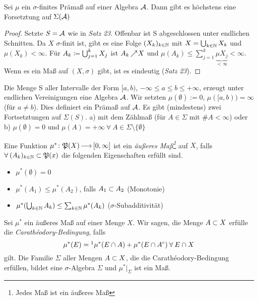 \documentclass[skript.tex]{subfiles}
\begin{document}
	\begin{cor}
		Sei $\mu$ ein $\sigma$-finites Prämaß auf einer Algebra $\mathcal{A}$. Dann gibt es höchstens eine Forsetztung auf $\Sigma(\mathcal{A})$
	\end{cor}
	\begin{proof}
		Setzte $S=\mathcal{A}$ wie in \textit{Satz 23}. Offenbar ist S abgeschlossen unter endlichen Schnitten. Da $X$ $\sigma$-finit ist, gibt es eine Folge $(X_k)_{k\in\mathbb{N}}$ mit $X=\bigcup_{k\in\mathbb{N}}X_k$ und $\mu(X_k)<\infty$. Für $A_k\coloneqq\bigcup_{j=1}^{k}X_j$ ist $A_k \kern -1pt \nearrow \kern -2pt X$ und $\mu(A_k) \leq \sum_{j=1}^{k}\underbrace{\mu{X_j}}_{<\infty}<\infty$. Wenn es ein Maß auf $(X,\sigma)$ gibt, ist es eindeutig (\textit{Satz 23}).
	\end{proof}

	\begin{bsp}
		Die Menge S aller Intervalle der Form $[a,b)$, $-\infty\leq a \leq b \leq +\infty$, erzeugt unter endlichen Vereinigungen eine Algebra $\mathcal{A}$. Wir setzten $\mu(\emptyset):=0$, $\mu([a,b))=\infty$ (für $a\neq b$). Dies definiert ein Prämaß auf $\mathcal{A}$. Es gibt (mindestens) zwei Fortsetztungen auf $\Sigma(S)$. a) mit dem Zählmaß (für $A\in\Sigma$ mit $\#A<\infty$) oder b) $\mu(\emptyset)=0$ und $\mu(A)=+\infty \: \forall \: A\in\Sigma \setminus \{\emptyset\}$
	\end{bsp}

	\begin{defin}
		Eine Funktion $\mu^*\colon\mathfrak{P}(X)\kern -1pt \longrightarrow \kern -1pt[0,\infty]$ ist ein \textit{äußeres Maß\footnote{Jedes Maß ist ein äußeres Maß}} auf $X$, falls $\forall \: (A_k)_{k\in\mathbb{N}} \subset \mathfrak{P}(x)$ die folgenden Eigenschaften erfüllt sind.
		\begin{itemize}
			\item $\mu^*(\emptyset)=0$
			\item $\mu^*(A_1)\leq \mu^*(A_2)$, falls $A_1 \subset A_2$ (Monotonie)
			\item $\mu^*(\bigcup_{k\in\mathbb{N}}A_k)\leq \sum_{k\in\mathbb{N}}\mu^*(A_k)$ ($\sigma$-Subadditivität)
		\end{itemize}
	\end{defin}

	\begin{theorem}
		Sei $\mu^*$ ein äußeres Maß auf einer Menge $X$. Wir sagen, die Menge $A \subset X$ erfülle die \textit{Carathéodory-Bedingung}, falls
			\begin{equation*}
				\mu^*(E)=\footnotemark \mu^*(E \cap A) + \mu^*(E \cap A^c) \: \forall \: E \cap X
			\end{equation*}
		gilt. Die Familie $\Sigma$ aller Mengen $A \subset X$, die die Carathéodory-Bedingung erfüllen, bildet eine $\sigma$-Algebra $\Sigma$ und $\mu^*|_\Sigma$ ist ein Maß.
	\end{theorem}
\end{document}
